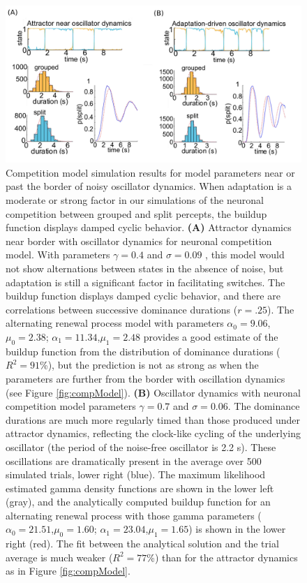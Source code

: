 \begin{figure}
	\centering
	\includegraphics[scale=.8]{ch2Figs/5-figs5_6_cyclicbufs.jpg}
	\caption{Competition model simulation results for model parameters near or past the border of noisy oscillator dynamics. When adaptation is a moderate or strong factor in our simulations of the neuronal competition between grouped and split percepts, the buildup function displays damped cyclic behavior. \textbf{(A)} Attractor dynamics near border with oscillator dynamics for neuronal competition model. With parameters $\gamma=0.4$ and $\sigma=0.09$ , this model would not show alternations between states in the absence of noise, but adaptation is still a significant factor in facilitating switches. The buildup function displays damped cyclic behavior, and there are correlations between successive dominance durations ($r = .25$). The alternating renewal process model with parameters $\alpha_0=9.06$,$\mu_0=2.38$; $\alpha_1=11.34$,$\mu_1=2.48$ provides a good estimate of the buildup function from the distribution of dominance durations ($R^2=91$\%), but the prediction is not as strong as when the parameters are further from the border with oscillation dynamics (see Figure \ref{fig:compModel}). \textbf{(B)} Oscillator dynamics with neuronal competition model parameters $\gamma=0.7$ and $\sigma=0.06$. The dominance durations are much more regularly timed than those produced under attractor dynamics, reflecting the clock-like cycling of the underlying oscillator (the period of the noise-free oscillator is 2.2 s). These oscillations are dramatically present in the average over 500 simulated trials, lower right (blue). The maximum likelihood estimated gamma density functions are shown in the lower left (gray), and the analytically computed buildup function for an alternating renewal process with those gamma parameters ($\alpha_0=21.51$,$\mu_0=1.60$; $\alpha_1=23.04$,$\mu_1=1.65$) is shown in the lower right (red). The fit between the analytical solution and the trial average is much weaker ($R^2= 77$\%) than for the attractor dynamics as in Figure \ref{fig:compModel}.}
	\label{fig:osc}
\end{figure}

